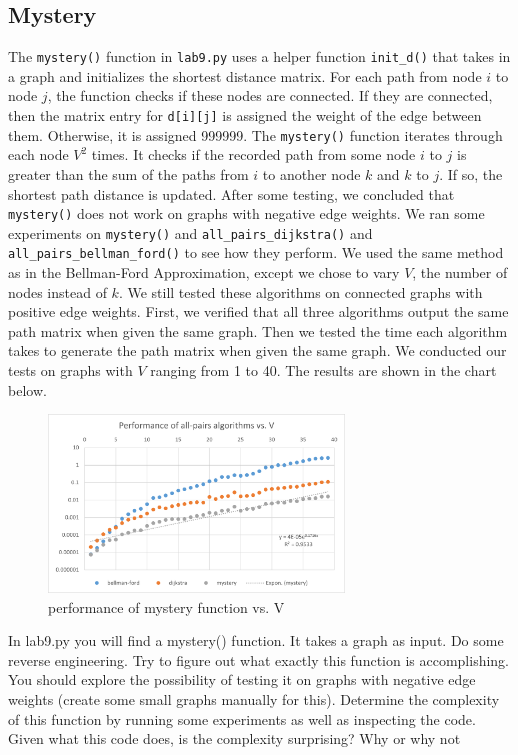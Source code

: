 \documentclass[12pt]{article}
\begin{document}
\subsection{Mystery}
The \verb+mystery()+ function in \verb+lab9.py+ uses a helper function \verb+init_d()+ that takes in a graph and initializes the shortest distance matrix. For each path from node $i$ to node $j$, the function checks if these nodes are connected. If they are connected, then the matrix entry for \verb+d[i][j]+ is assigned the weight of the edge between them. Otherwise, it is assigned 999999. The \verb+mystery()+ function iterates through each node $V^2$ times. It checks if the recorded path from some node $i$ to $j$ is greater than the sum of the paths from $i$ to another node $k$ and $k$ to $j$. If so, the shortest path distance is updated. After some testing, we concluded that \verb+mystery()+ does not work on graphs with negative edge weights. We ran some experiments on \verb+mystery()+ and \verb+all_pairs_dijkstra()+ and \verb+all_pairs_bellman_ford()+ to see how they perform. We used the same method as in the Bellman-Ford Approximation, except we chose to vary $V$, the number of nodes instead of $k$. We still tested these algorithms on connected graphs with positive edge weights. First, we verified that all three algorithms output the same path matrix when given the same graph. Then we tested the time each algorithm takes to generate the path matrix when given the same graph. We conducted our tests on graphs with $V$ ranging from 1 to 40. The results are shown in the chart below.
\begin{figure}[H]
\centering
\includegraphics[width=0.7\textwidth,height=\textheight,keepaspectratio]{mystery.png}
\caption{performance of mystery function vs. V}
\label{Figure: m3}
\end{figure}
In lab9.py you will find a mystery() function. It takes a graph as input. Do some reverse
engineering. Try to figure out what exactly this function is accomplishing. You should explore
the possibility of testing it on graphs with negative edge weights (create some small graphs
manually for this). Determine the complexity of this function by running some experiments as
well as inspecting the code. Given what this code does, is the complexity surprising? Why or
why not
\end{document}
